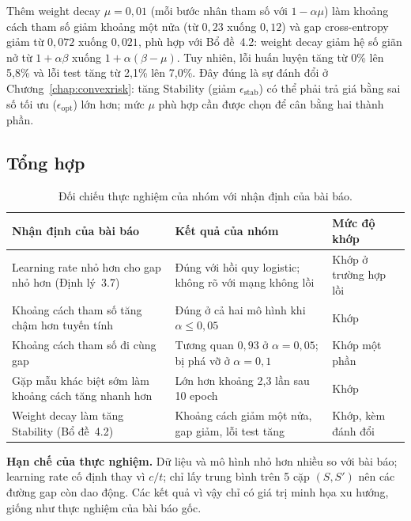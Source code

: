 Thêm weight decay $\mu = 0{,}01$ (mỗi bước nhân tham số với $1 - \alpha\mu$) làm khoảng cách tham số giảm khoảng một nửa (từ $0{,}23$ xuống $0{,}12$) và gap cross-entropy giảm từ $0{,}072$ xuống $0{,}021$, phù hợp với Bổ đề~4.2: weight decay giảm hệ số giãn nở từ $1 + \alpha\beta$ xuống $1 + \alpha(\beta - \mu)$. Tuy nhiên, lỗi huấn luyện tăng từ 0\% lên 5,8\% và lỗi test tăng từ 2,1\% lên 7,0\%. Đây đúng là sự đánh đổi ở Chương~\ref{chap:convexrisk}: tăng Stability (giảm $\epsilon_{\mathrm{stab}}$) có thể phải trả giá bằng sai số tối ưu ($\epsilon_{\mathrm{opt}}$) lớn hơn; mức $\mu$ phù hợp cần được chọn để cân bằng hai thành phần.

\subsection{Tổng hợp}

\begin{table}[H]
\centering
\caption{Đối chiếu thực nghiệm của nhóm với nhận định của bài báo.}
\label{tab:doichieu}
\begin{tabular}{|p{5.4cm}|p{4cm}|p{3.8cm}|}
\hline
\textbf{Nhận định của bài báo} & \textbf{Kết quả của nhóm} & \textbf{Mức độ khớp} \\ \hline
Learning rate nhỏ hơn cho gap nhỏ hơn (Định lý~3.7) & Đúng với hồi quy logistic; không rõ với mạng không lồi & Khớp ở trường hợp lồi \\ \hline
Khoảng cách tham số tăng chậm hơn tuyến tính & Đúng ở cả hai mô hình khi $\alpha \le 0{,}05$ & Khớp \\ \hline
Khoảng cách tham số đi cùng gap & Tương quan $0{,}93$ ở $\alpha = 0{,}05$; bị phá vỡ ở $\alpha = 0{,}1$ & Khớp một phần \\ \hline
Gặp mẫu khác biệt sớm làm khoảng cách tăng nhanh hơn & Lớn hơn khoảng 2,3 lần sau 10 epoch & Khớp \\ \hline
Weight decay làm tăng Stability (Bổ đề~4.2) & Khoảng cách giảm một nửa, gap giảm, lỗi test tăng & Khớp, kèm đánh đổi \\ \hline
\end{tabular}
\end{table}

\textbf{Hạn chế của thực nghiệm.} Dữ liệu và mô hình nhỏ hơn nhiều so với bài báo; learning rate cố định thay vì $c/t$; chỉ lấy trung bình trên 5 cặp $(S, S')$ nên các đường gap còn dao động. Các kết quả vì vậy chỉ có giá trị minh họa xu hướng, giống như thực nghiệm của bài báo gốc.
